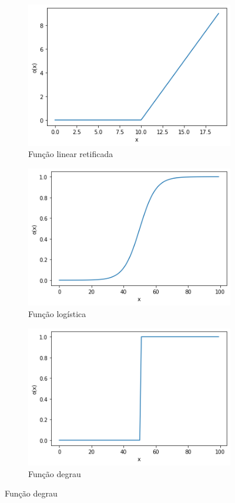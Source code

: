 \documentclass[
    12pt,
    oneside,
    a4paper,
    english,
    brazil
]{abntex2}
\begin{document}
\begin{figure}[ht]
    \centering
    \caption{Funções de ativação}\label{fig:ativacao}
    \begin{subfigure}{.3\textwidth}
        \centering
        \caption{Função linear retificada}
        \includegraphics[width=.9\linewidth]{images/relu.png}
    \end{subfigure}
    \begin{subfigure}{.3\textwidth}
        \centering
        \caption{Função logística}
        \includegraphics[width=.9\linewidth]{images/sigmoid.png}
    \end{subfigure}
    \begin{subfigure}{.3\textwidth}
        \centering
        \caption{Função degrau}
        \includegraphics[width=.9\linewidth]{images/degrau.png}
    \end{subfigure}
\end{figure}
\end{document}
